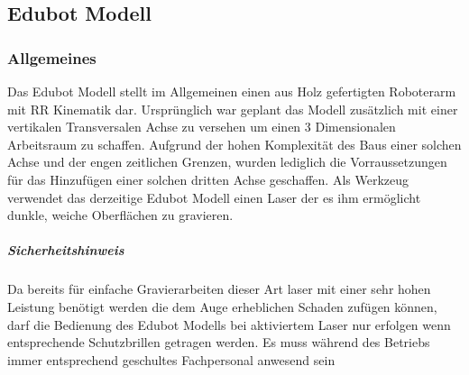  \subsection{Edubot Modell}
\subsubsection{Allgemeines}
Das Edubot Modell stellt im Allgemeinen einen aus Holz gefertigten Roboterarm mit RR Kinematik dar. Ursprünglich war geplant das Modell zusätzlich mit einer vertikalen Transversalen Achse zu versehen um einen 3 Dimensionalen Arbeitsraum zu schaffen. Aufgrund der hohen Komplexität des Baus einer solchen Achse und der engen zeitlichen Grenzen, wurden lediglich die Vorraussetzungen für das Hinzufügen einer solchen dritten Achse geschaffen. Als Werkzeug verwendet das derzeitige Edubot Modell einen Laser der es ihm ermöglicht dunkle, weiche Oberflächen zu gravieren.

\subparagraph{Sicherheitshinweis}

Da bereits für einfache Gravierarbeiten dieser Art laser mit einer sehr hohen Leistung benötigt werden die dem Auge erheblichen Schaden zufügen können, darf die Bedienung des Edubot Modells bei aktiviertem Laser nur erfolgen wenn entsprechende Schutzbrillen getragen werden. Es muss während des Betriebs immer entsprechend geschultes Fachpersonal anwesend sein
